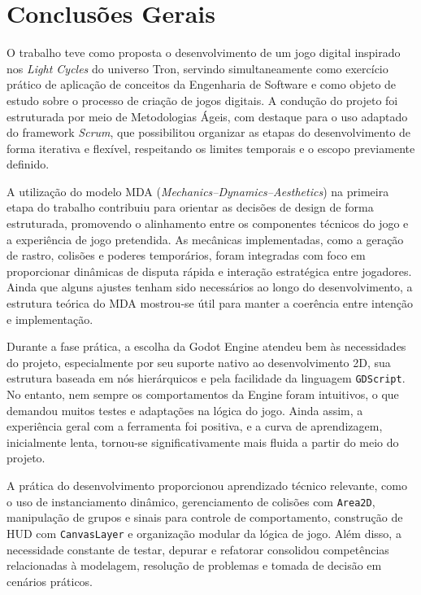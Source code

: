 \chapter[Conclusões Gerais]{Conclusões Gerais}

O trabalho teve como proposta o desenvolvimento de um jogo digital inspirado nos \textit{Light Cycles} do universo Tron, servindo simultaneamente como exercício prático de aplicação de conceitos da Engenharia de Software e como objeto de estudo sobre o processo de criação de jogos digitais. A condução do projeto foi estruturada por meio de Metodologias Ágeis, com destaque para o uso adaptado do framework \textit{Scrum}, que possibilitou organizar as etapas do desenvolvimento de forma iterativa e flexível, respeitando os limites temporais e o escopo previamente definido.

A utilização do modelo MDA (\textit{Mechanics–Dynamics–Aesthetics}) na primeira etapa do trabalho contribuiu para orientar as decisões de design de forma estruturada, promovendo o alinhamento entre os componentes técnicos do jogo e a experiência de jogo pretendida. As mecânicas implementadas, como a geração de rastro, colisões e poderes temporários, foram integradas com foco em proporcionar dinâmicas de disputa rápida e interação estratégica entre jogadores. Ainda que alguns ajustes tenham sido necessários ao longo do desenvolvimento, a estrutura teórica do MDA mostrou-se útil para manter a coerência entre intenção e implementação.

Durante a fase prática, a escolha da Godot Engine atendeu bem às necessidades do projeto, especialmente por seu suporte nativo ao desenvolvimento 2D, sua estrutura baseada em nós hierárquicos e pela facilidade da linguagem \texttt{GDScript}. No entanto, nem sempre os comportamentos da Engine foram intuitivos, o que demandou muitos testes e adaptações na lógica do jogo. Ainda assim, a experiência geral com a ferramenta foi positiva, e a curva de aprendizagem, inicialmente lenta, tornou-se significativamente mais fluida a partir do meio do projeto.

A prática do desenvolvimento proporcionou aprendizado técnico relevante, como o uso de instanciamento dinâmico, gerenciamento de colisões com \texttt{Area2D}, manipulação de grupos e sinais para controle de comportamento, construção de HUD com \texttt{CanvasLayer} e organização modular da lógica de jogo. Além disso, a necessidade constante de testar, depurar e refatorar consolidou competências relacionadas à modelagem, resolução de problemas e tomada de decisão em cenários práticos.

